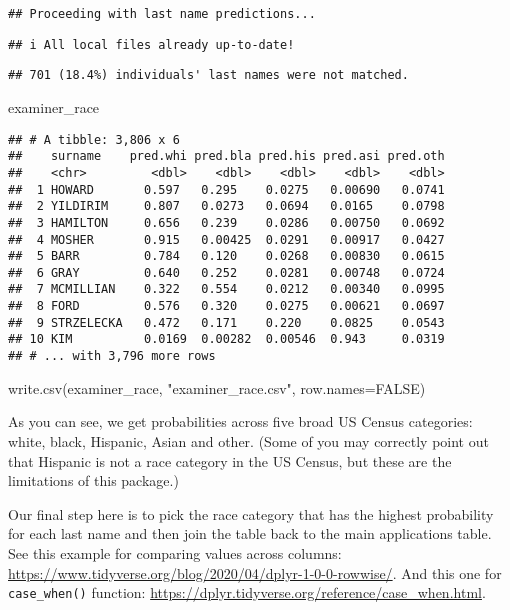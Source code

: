 \documentclass[
]{article}
\newenvironment{Shaded}{\begin{snugshade}}{\end{snugshade}}
\newcommand{\AttributeTok}[1]{\textcolor[rgb]{0.77,0.63,0.00}{#1}}
\newcommand{\ConstantTok}[1]{\textcolor[rgb]{0.00,0.00,0.00}{#1}}
\newcommand{\FunctionTok}[1]{\textcolor[rgb]{0.00,0.00,0.00}{#1}}
\newcommand{\NormalTok}[1]{#1}
\newcommand{\StringTok}[1]{\textcolor[rgb]{0.31,0.60,0.02}{#1}}
\begin{document}
\begin{verbatim}
## Proceeding with last name predictions...
\end{verbatim}

\begin{verbatim}
## i All local files already up-to-date!
\end{verbatim}

\begin{verbatim}
## 701 (18.4%) individuals' last names were not matched.
\end{verbatim}

\begin{Shaded}
\begin{Highlighting}[]
\NormalTok{examiner\_race}
\end{Highlighting}
\end{Shaded}

\begin{verbatim}
## # A tibble: 3,806 x 6
##    surname    pred.whi pred.bla pred.his pred.asi pred.oth
##    <chr>         <dbl>    <dbl>    <dbl>    <dbl>    <dbl>
##  1 HOWARD       0.597   0.295    0.0275   0.00690   0.0741
##  2 YILDIRIM     0.807   0.0273   0.0694   0.0165    0.0798
##  3 HAMILTON     0.656   0.239    0.0286   0.00750   0.0692
##  4 MOSHER       0.915   0.00425  0.0291   0.00917   0.0427
##  5 BARR         0.784   0.120    0.0268   0.00830   0.0615
##  6 GRAY         0.640   0.252    0.0281   0.00748   0.0724
##  7 MCMILLIAN    0.322   0.554    0.0212   0.00340   0.0995
##  8 FORD         0.576   0.320    0.0275   0.00621   0.0697
##  9 STRZELECKA   0.472   0.171    0.220    0.0825    0.0543
## 10 KIM          0.0169  0.00282  0.00546  0.943     0.0319
## # ... with 3,796 more rows
\end{verbatim}

\begin{Shaded}
\begin{Highlighting}[]
\FunctionTok{write.csv}\NormalTok{(examiner\_race, }\StringTok{"examiner\_race.csv"}\NormalTok{, }\AttributeTok{row.names=}\ConstantTok{FALSE}\NormalTok{)}
\end{Highlighting}
\end{Shaded}

As you can see, we get probabilities across five broad US Census
categories: white, black, Hispanic, Asian and other. (Some of you may
correctly point out that Hispanic is not a race category in the US
Census, but these are the limitations of this package.)

Our final step here is to pick the race category that has the highest
probability for each last name and then join the table back to the main
applications table. See this example for comparing values across
columns:
\url{https://www.tidyverse.org/blog/2020/04/dplyr-1-0-0-rowwise/}. And
this one for \texttt{case\_when()} function:
\url{https://dplyr.tidyverse.org/reference/case_when.html}.
\end{document}
